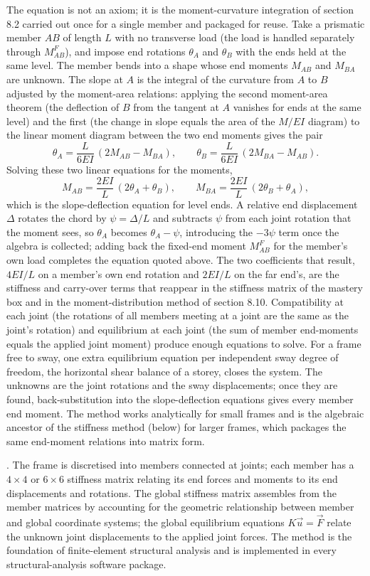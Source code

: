 The equation is not an axiom; it is the moment-curvature integration of
section 8.2 carried out once for a single member and packaged for reuse.
Take a prismatic member $AB$ of length $L$ with no transverse load (the
load is handled separately through $M^F_{AB}$), and impose end rotations
$\theta_A$ and $\theta_B$ with the ends held at the same level. The
member bends into a shape whose end moments $M_{AB}$ and $M_{BA}$ are
unknown. The slope at $A$ is the integral of the curvature from $A$ to
$B$ adjusted by the moment-area relations: applying the second
moment-area theorem (the deflection of $B$ from the tangent at $A$
vanishes for ends at the same level) and the first (the change in slope
equals the area of the $M/EI$ diagram) to the linear moment diagram
between the two end moments gives the pair
\[
\theta_A = \frac{L}{6EI}\,(2M_{AB} - M_{BA}), \qquad
\theta_B = \frac{L}{6EI}\,(2M_{BA} - M_{AB}).
\]
Solving these two linear equations for the moments,
\[
M_{AB} = \frac{2EI}{L}\,(2\theta_A + \theta_B), \qquad
M_{BA} = \frac{2EI}{L}\,(2\theta_B + \theta_A),
\]
which is the slope-deflection equation for level ends. A relative end
displacement $\Delta$ rotates the chord by $\psi=\Delta/L$ and subtracts
$\psi$ from each joint rotation that the moment sees, so $\theta_A$ becomes
$\theta_A-\psi$, introducing the $-3\psi$ term once the algebra is
collected; adding back the fixed-end moment $M^F_{AB}$ for the
member's own load completes the equation quoted above. The two coefficients
that result, $4EI/L$ on a member's own end rotation and $2EI/L$ on the far
end's, are the stiffness and carry-over terms that reappear in the
stiffness matrix of the mastery box and in the moment-distribution method
of section 8.10. Compatibility at
each joint (the rotations of all members meeting at a joint are the
same as the joint's rotation) and equilibrium at each joint (the
sum of member end-moments equals the applied joint moment) produce
enough equations to solve. For a frame free to sway, one extra
equilibrium equation per independent sway degree of freedom, the
horizontal shear balance of a storey, closes the system. The unknowns
are the joint rotations and the sway displacements; once they are
found, back-substitution into the slope-deflection equations gives every
member end moment. The method works analytically for small
frames and is the algebraic ancestor of the stiffness method (below)
for larger frames, which packages the same end-moment relations into
matrix form.

. The frame is discretised into members
connected at joints; each member has a $4 \times 4$ or $6 \times 6$
stiffness matrix relating its end forces and moments to its end
displacements and rotations. The global stiffness matrix assembles
from the member matrices by accounting for the geometric
relationship between member and global coordinate systems; the
global equilibrium equations $K \vec{u} = \vec{F}$ relate the
unknown joint displacements to the applied joint forces. The method
is the foundation of finite-element structural analysis and is
implemented in every structural-analysis software package.

